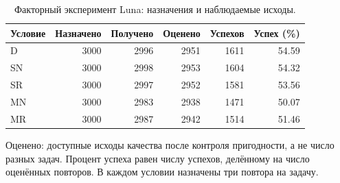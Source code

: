 \begin{table}[htbp]\centering\small
\caption{Факторный эксперимент Luna: назначения и наблюдаемые исходы.}
\label{tab:scale-quality}
\begin{tabular}{lrrrrr}\toprule
Условие & Назначено & Получено & Оценено & Успехов & Успех (\%)\\\midrule
D & 3000 & 2996 & 2951 & 1611 & 54.59\\
SN & 3000 & 2998 & 2953 & 1604 & 54.32\\
SR & 3000 & 2997 & 2952 & 1581 & 53.56\\
MN & 3000 & 2983 & 2938 & 1471 & 50.07\\
MR & 3000 & 2987 & 2942 & 1514 & 51.46\\
\bottomrule\end{tabular}
\par\smallskip\noindent Оценено: доступные исходы качества после контроля пригодности, а не число разных задач. Процент успеха равен числу успехов, делённому на число оценённых повторов. В каждом условии назначены три повтора на задачу.
\end{table}

